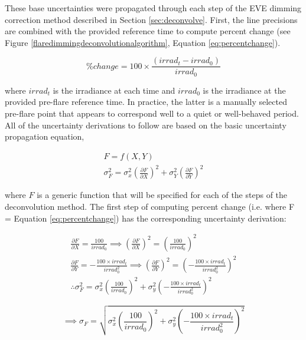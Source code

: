 These base uncertainties were propagated through each step of the EVE dimming correction method described in Section \ref{sec:deconvolve}. First, the line precisions are combined with the provided reference time to compute percent change (see Figure \ref{flaredimmingdeconvolutionalgorithm}, Equation \ref{eq:percentchange}). 

\begin{equation} 
    \% change = 100 \times \frac{(irrad_t - irrad_0)}{irrad_0}
    \label{eq:percentchange}
\end{equation}

\noindent where $irrad_t$ is the irradiance at each time and $irrad_0$ is the irradiance at the provided pre-flare reference time. In practice, the latter is a manually selected pre-flare point that appears to correspond well to a quiet or well-behaved period. All of the uncertainty derivations to follow are based on the basic uncertainty propagation equation, 

\begin{gather}
    F = f(X,Y) \\
    \sigma^2_F = \sigma^2_x(\frac{\partial F}{\partial X})^2 + \sigma^2_Y(\frac{\partial F}{\partial Y})^2
    \label{eq:genericuncertainty}
\end{gather}

\noindent where $F$ is a generic function that will be specified for each of the steps of the deconvolution method. The first step of computing percent change (i.e. where F = Equation \ref{eq:percentchange}) has the corresponding uncertainty derivation: 

\begin{gather*} 
    \frac{\partial F}{\partial X} = \frac{100}{irrad_0} \implies 
    (\frac{\partial F}{\partial X})^2 = (\frac{100}{irrad_0})^2 \\    
    \frac{\partial F}{\partial Y} = -\frac{100 \times irrad_t}{irrad_0^2} 
    \implies (\frac{\partial F}{\partial Y})^2 = (-\frac{100 \times irrad_t}{irrad_0^2})^2 \\
    \therefore \sigma^2_F = \sigma^2_x(\frac{100}{irrad_0})^2 + \sigma^2_y(-\frac{100 \times irrad_t}{irrad_0^2})^2
    \label{eq:percentchangeuncertaintyderivation}
\end{gather*}

\begin{equation}
    \implies \sigma _F = \sqrt{\sigma^2_x(\frac{100}{irrad_0})^2 + \sigma^2_y(-\frac{100 \times irrad_t}{irrad_0^2})^2}
    \label{eq:percentchangeuncertainty}
\end{equation}


